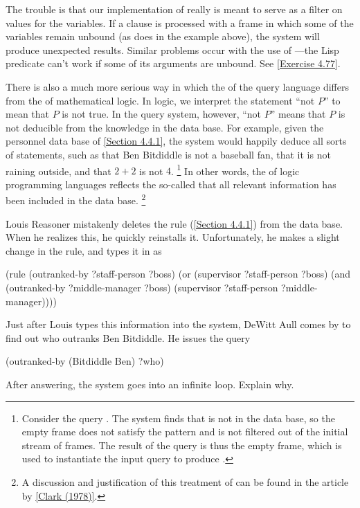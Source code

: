 The trouble is that our implementation of  really is meant to serve as a filter on values for the variables.
If a  clause is processed with a frame in which some of the variables remain unbound (as does  in the example above), the system will produce unexpected results.
Similar problems occur with the use of ---the Lisp predicate can’t work if some of its arguments are unbound.
See \cref{Exercise 4.77}.

There is also a much more serious way in which the  of the query language differs from the  of mathematical logic.
In logic, we interpret the statement “not \( P \)” to mean that \( P \) is not true.
In the query system, however, “not \( P \)” means that \( P \) is not deducible from the knowledge in the data base.
For example, given the personnel data base of \cref{Section 4.4.1}, the system would happily deduce all sorts of  statements, such as that Ben Bitdiddle is not a baseball fan, that it is not raining outside, and that \( 2 + 2 \) is not \( 4 \).%
\footnote{
	Consider the query .
	The system finds that  is not in the data base, so the empty frame does not satisfy the pattern and is not filtered out of the initial stream of frames.
	The result of the query is thus the empty frame, which is used to instantiate the input query to produce .
}
In other words, the  of logic programming languages reflects the so-called  that all relevant information has been included in the data base.%
\footnote{
	A discussion and justification of this treatment of  can be found in the article by \cref{Clark (1978)}.
}



\begin{exercise}
	\label{Exercise 4.64}
	Louis Reasoner mistakenly deletes the  rule (\cref{Section 4.4.1}) from the data base.
	When he realizes this, he quickly reinstalls it.
	Unfortunately, he makes a slight change in the rule, and types it in as
	\begin{scheme}
	  (rule (outranked-by ?staff-person ?boss)
	        (or (supervisor ?staff-person ?boss)
	            (and (outranked-by ?middle-manager ?boss)
	                 (supervisor ?staff-person
	                             ?middle-manager))))
	\end{scheme}
	Just after Louis types this information into the system, DeWitt Aull comes by
	to find out who outranks Ben Bitdiddle. He issues the query
	\begin{scheme}
	  (outranked-by (Bitdiddle Ben) ?who)
	\end{scheme}
	After answering, the system goes into an infinite loop.  Explain why.
\end{exercise}



